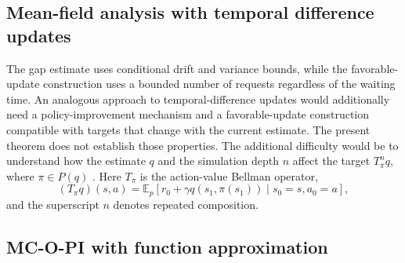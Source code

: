 \documentclass[twoside,11pt]{article}
\DeclareRobustCommand{\reviewbarstart}{%
  \ifhmode %
    \vadjust{\vbox to 0pt{%
      \vskip-\ht\strutbox %
      \vskip-\dp\strutbox %
      \cbstart[\changebarwidth] %
      \vss %
    }}%
  \else %
    \cbstart[\changebarwidth]%
  \fi %
} %
\providecommand{\DIFadd}[1]{#1} %
\providecommand{\DIFaddbegin}{\reviewbarstart} %
\providecommand{\DIFaddend}{\protect\cbend} %
\def\DIFadd#1{#1}%
\def\DIFaddbegin{}%
\def\DIFaddend{}%
\begin{document}









\subsection{Mean-field analysis with temporal difference updates}
\label{sec: discussion temporal difference}

The  \DIFaddbegin \DIFadd{gap estimate uses conditional drift and variance bounds, while the favorable-update construction uses a bounded number of requests regardless of the waiting time. An analogous approach to }\DIFaddend temporal-difference updates  \DIFaddbegin \DIFadd{would additionally need a policy-improvement mechanism and a favorable-update construction compatible with targets that change with the current estimate. The present theorem does not establish those properties.
The }\DIFaddend additional difficulty would be to understand how the  estimate $q$ and the \DIFaddbegin \DIFadd{simulation }\DIFaddend depth $n$  affect the target $T_{\pi}^n q$, where $\pi \in P(q)$ \DIFaddbegin \DIFadd{. Here }\DIFaddend $T_\pi$ is the  \DIFaddbegin \DIFadd{action-value Bellman operator,
}\[
\DIFadd{(T_\pi q)(s,a)=\mathbb E_p\!\left[r_0+\gamma q(s_1,\pi(s_1))\mid s_0=s,a_0=a\right],
}\]
\DIFadd{and the superscript $n$ denotes repeated composition}\DIFaddend .


\subsection{MC-O-PI with function approximation}
\label{sec: discussion function approximation}
\end{document}
